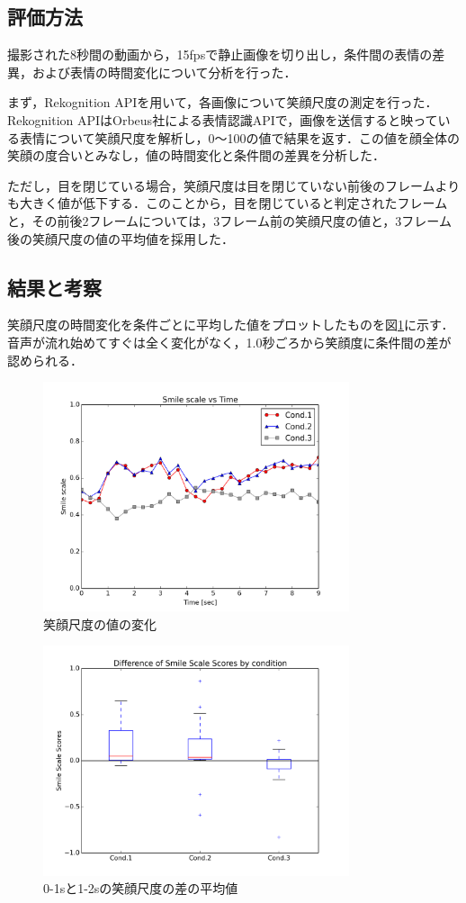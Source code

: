 \documentclass[submit,techreq]{ec2014}
\begin{document}
\subsection{評価方法}

撮影された8秒間の動画から，15fpsで静止画像を切り出し，条件間の表情の差異，および表情の時間変化について分析を行った．

まず，Rekognition APIを用いて，各画像について笑顔尺度の測定を行った．Rekognition APIはOrbeus社による表情認識APIで，画像を送信すると映っている表情について笑顔尺度を解析し，0〜100の値で結果を返す．この値を顔全体の笑顔の度合いとみなし，値の時間変化と条件間の差異を分析した．

ただし，目を閉じている場合，笑顔尺度は目を閉じていない前後のフレームよりも大きく値が低下する．このことから，目を閉じていると判定されたフレームと，その前後2フレームについては，3フレーム前の笑顔尺度の値と，3フレーム後の笑顔尺度の値の平均値を採用した．

\subsection{結果と考察}

笑顔尺度の時間変化を条件ごとに平均した値をプロットしたものを図\ref{graph-smooth}に示す．音声が流れ始めてすぐは全く変化がなく，1.0秒ごろから笑顔度に条件間の差が認められる．

\begin{figure}[h!]
  \centering  
\includegraphics[width=90mm, bb=0 0 600 450]{images/smooth5_avg.png}
\caption{笑顔尺度の値の変化}
  \label{graph-smooth}
\end{figure}


\begin{figure}[h!]
  \centering  
\includegraphics[width=90mm, bb=0 0 600 450]{images/graph-diff.png}
\caption{0-1sと1-2sの笑顔尺度の差の平均値}
  \label{graph-avg}
\end{figure}
\end{document}
